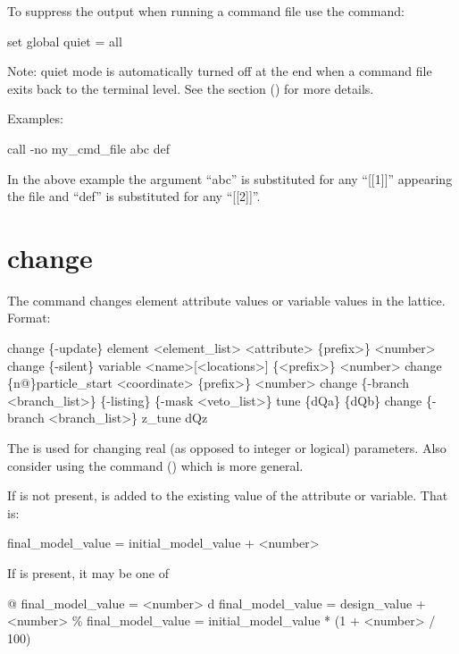 To suppress the output when running a command file use the command:
\begin{example}
  set global quiet = all
\end{example}
Note: quiet mode is automatically turned off at the end when a command file exits back to the
terminal level. See the  section () for
more details.

Examples:
\begin{example}
    call -no my_cmd_file abc def 
\end{example}
In the above example the argument ``abc'' is substituted for any ``[[1]]'' appearing the
file and ``def'' is substituted for any ``[[2]]''.  \Newline

\section{change}
\label{s:change}

The  command changes element attribute values or variable values in the 
lattice. Format:
\begin{example}
  change \{-update\} element <element_list> <attribute> \{prefix>\} <number>
  change \{-silent\} variable <name>[<locations>] \{<prefix>\} <number>
  change \{n@\}particle_start <coordinate> \{prefix>\} <number>
  change \{-branch <branch_list>\} \{-listing\} \{-mask <veto_list>\} tune \{dQa\} \{dQb\}
  change \{-branch <branch_list>\} z_tune dQz
\end{example}

\vskip 10pt 
The  is used for changing real (as opposed to integer or logical) parameters. Also
consider using the  command () which is more general.

If  is not present,  is added to the existing value
of the attribute or variable. That is:
\begin{example}
  final_model_value = initial_model_value + <number>
\end{example}
If  is present, it may be one of
\begin{example}
  @       final_model_value = <number>
  d       final_model_value = design_value + <number>
  \%       final_model_value = initial_model_value * (1 + <number> / 100)
\end{example}

